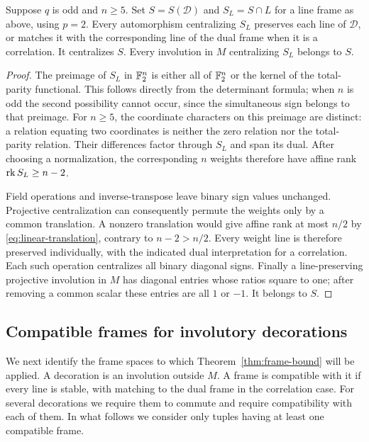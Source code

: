 \begin{lemma}\label{lem:linear-sign-centralizer}
Suppose $q$ is odd and $n\ge5$.  Set
$S=S(\mathcal D)$ and $S_L=S\cap L$ for a line frame as above, using
$p=2$.  Every automorphism centralizing $S_L$ preserves each line of
$\mathcal D$, or matches it with the corresponding line of the dual
frame when it is a correlation.  It centralizes $S$.  Every involution
in $M$ centralizing $S_L$ belongs to $S$.
\end{lemma}

\begin{proof}
The preimage of $S_L$ in $\mathbb F_2^n$ is either all of $\mathbb F_2^n$ or
the kernel of the total-parity functional.  This follows directly from
the determinant formula; when $n$ is odd the second possibility cannot
occur, since the simultaneous sign belongs to that preimage.
For $n\ge5$, the coordinate characters on this preimage are distinct:
a relation equating two coordinates is neither the zero relation nor
the total-parity relation.  Their differences factor through $S_L$ and
span its dual.  After choosing a normalization, the corresponding $n$
weights therefore have affine rank $\operatorname{rk} S_L\ge n-2$.

Field operations and inverse-transpose leave binary sign values unchanged.
Projective centralization can consequently permute the weights only by a
common translation.  A nonzero translation would give affine rank at most
$n/2$ by \eqref{eq:linear-translation}, contrary to $n-2>n/2$.
Every weight line is therefore preserved individually, with the indicated
dual interpretation for a correlation.  Each such operation centralizes
all binary diagonal signs.  Finally a line-preserving projective
involution in $M$ has diagonal entries whose ratios square to one;
after removing a common scalar these entries are all $1$ or $-1$.
It belongs to $S$.
\end{proof}

\subsection{Compatible frames for involutory decorations}
\label{subsec:linear-compatible}

We next identify the frame spaces to which Theorem~\ref{thm:frame-bound}
will be applied.  A decoration is an involution outside $M$.  A frame is
compatible with it if every line is stable, with matching to the dual
frame in the correlation case.  For several decorations we require them
to commute and require compatibility with each of them.  In what follows
we consider only tuples having at least one compatible frame.

